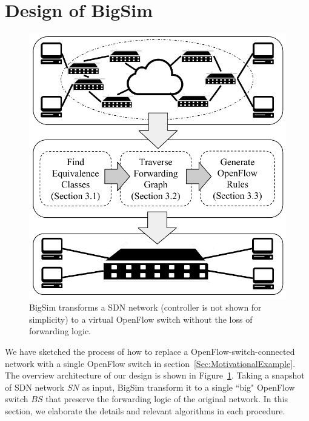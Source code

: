 \section{Design of BigSim}
\label{Sec:Design}

\begin{figure}[h]
\centering
\includegraphics[scale=.6]{figures/BigSimOverview.pdf}
\caption{BigSim transforms a SDN network (controller is not shown for simplicity) to a virtual OpenFlow switch without the loss of forwarding logic.}
\label{Fig:BigSimOverview}
\end{figure}

We have sketched the process of how to replace a OpenFlow-switch-connected network
with a single OpenFlow switch in section~\ref{Sec:MotivationalExample}.
The overview architecture of our design is shown in Figure~\ref{Fig:BigSimOverview}.
Taking a snapshot of SDN network $SN$ as input, BigSim transform it to a single ``big"
OpenFlow switch $BS$ that preserve the forwarding logic of the original network.
In this section, we elaborate the details and relevant algorithms
in each procedure.

